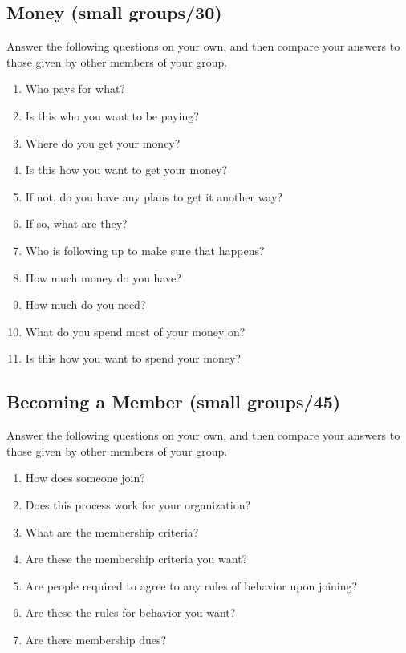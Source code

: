 \subsection{Money (small groups/30)}\label{money-small-groups30}

Answer the following questions on your own, and then compare your
answers to those given by other members of your group.

\begin{enumerate}
\item
  Who pays for what?
\item
  Is this who you want to be paying?
\item
  Where do you get your money?
\item
  Is this how you want to get your money?
\item
  If not, do you have any plans to get it another way?
\item
  If so, what are they?
\item
  Who is following up to make sure that happens?
\item
  How much money do you have?
\item
  How much do you need?
\item
  What do you spend most of your money on?
\item
  Is this how you want to spend your money?
\end{enumerate}

\subsection{Becoming a Member (small groups/45)}\label{becoming-a-member-small-groups45}

Answer the following questions on your own, and then compare your
answers to those given by other members of your group.

\begin{enumerate}
\item
  How does someone join?
\item
  Does this process work for your organization?
\item
  What are the membership criteria?
\item
  Are these the membership criteria you want?
\item
  Are people required to agree to any rules of behavior upon joining?
\item
  Are these the rules for behavior you want?
\item
  Are there membership dues?
\end{enumerate}


